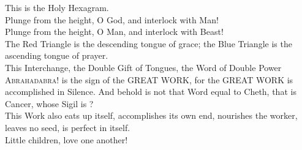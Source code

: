   \label{holyhexagram}
  \begin{Verse}
  This is the Holy Hexagram. \\
  Plunge from the height, O God, and interlock with Man! \\
  Plunge from the height, O Man, and interlock with Beast! \\
  The Red Triangle is the descending tongue of grace; the Blue Triangle is the ascending tongue of prayer. \\
  This Interchange, the Double Gift of Tongues, the Word of Double Power \textemdash{} \textsc{Abrahadabra!} \textemdash{} is the sign of the GREAT WORK, for the GREAT WORK is accomplished in Silence. And behold is not that Word equal to Cheth, that is Cancer, whose Sigil is \cancer{}? \\
  This Work also eats up itself, accomplishes its own end, nourishes the worker, leaves no seed, is perfect in itself. \\
  Little children, love one another! \\
  \end{Verse}
